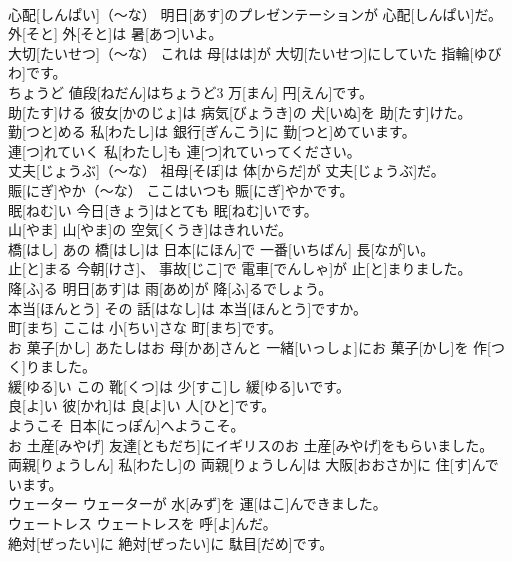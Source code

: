 \documentclass[8pt]{extreport}
\begin{document}
\begin{CJK}{UTF8}{min}
\\	心配[しんぱい]（～な）	明日[あす]のプレゼンテーションが 心配[しんぱい]だ。		
\\	外[そと]	外[そと]は 暑[あつ]いよ。		
\\	大切[たいせつ]（～な）	これは 母[はは]が 大切[たいせつ]にしていた 指輪[ゆびわ]です。		
\\	ちょうど	値段[ねだん]はちょうど3 万[まん] 円[えん]です。		
\\	助[たす]ける	彼女[かのじょ]は 病気[びょうき]の 犬[いぬ]を 助[たす]けた。		
\\	勤[つと]める	私[わたし]は 銀行[ぎんこう]に 勤[つと]めています。		
\\	連[つ]れていく	私[わたし]も 連[つ]れていってください。		
\\	丈夫[じょうぶ]（～な）	祖母[そぼ]は 体[からだ]が 丈夫[じょうぶ]だ。		
\\	賑[にぎ]やか（～な）	ここはいつも 賑[にぎ]やかです。		
\\	眠[ねむ]い	今日[きょう]はとても 眠[ねむ]いです。		
\\	山[やま]	山[やま]の 空気[くうき]はきれいだ。		
\\	橋[はし]	あの 橋[はし]は 日本[にほん]で 一番[いちばん] 長[なが]い。		
\\	止[と]まる	今朝[けさ]、 事故[じこ]で 電車[でんしゃ]が 止[と]まりました。		
\\	降[ふ]る	明日[あす]は 雨[あめ]が 降[ふ]るでしょう。		
\\	本当[ほんとう]	その 話[はなし]は 本当[ほんとう]ですか。		
\\	町[まち]	ここは 小[ちい]さな 町[まち]です。		
\\	お 菓子[かし]	あたしはお 母[かあ]さんと 一緒[いっしょ]にお 菓子[かし]を 作[つく]りました。		
\\	緩[ゆる]い	この 靴[くつ]は 少[すこ]し 緩[ゆる]いです。		
\\	良[よ]い	彼[かれ]は 良[よ]い 人[ひと]です。		
\\	ようこそ	日本[にっぽん]へようこそ。		
\\	お 土産[みやげ]	友達[ともだち]にイギリスのお 土産[みやげ]をもらいました。		
\\	両親[りょうしん]	私[わたし]の 両親[りょうしん]は 大阪[おおさか]に 住[す]んでいます。		
\\	ウェーター	ウェーターが 水[みず]を 運[はこ]んできました。		
\\	ウェートレス	ウェートレスを 呼[よ]んだ。		
\\	絶対[ぜったい]に	絶対[ぜったい]に 駄目[だめ]です。		

\end{CJK}
\end{document}
